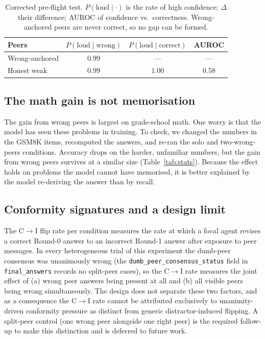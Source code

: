 \documentclass[11pt]{article}
\begin{document}
\begin{table}[t]
\centering
\small
\caption{Corrected pre-flight test. $P(\text{loud}\mid\cdot)$ is the rate of
high confidence; $\Delta$ their difference; AUROC of confidence vs.\
correctness. Wrong-anchored peers are never correct, so no gap can be
formed.\label{tab:gate}}
\begin{tabular}{@{}lccc@{}}
\toprule
Peers & $P(\text{loud}\!\mid\!\text{wrong})$ & $P(\text{loud}\!\mid\!\text{correct})$ & AUROC \\
\midrule
Wrong-anchored & $0.99$ & --- & --- \\
Honest weak    & $0.99$ & $1.00$ & $0.58$ \\
\bottomrule
\end{tabular}
\end{table}

\subsection{The math gain is not memorisation}
\label{sub:contam}

The gain from wrong peers is largest on grade-school math.
One worry is that the model has seen these problems in training.
To check, we changed the numbers in the GSM8K items, recomputed the
answers, and re-ran the solo and two-wrong-peers conditions.
Accuracy drops on the harder, unfamiliar numbers, but the gain from wrong
peers survives at a similar size (Table~\ref{tab:stats}).
Because the effect holds on problems the model cannot have memorised, it is
better explained by the model re-deriving the answer than by recall.

\subsection{Conformity signatures and a design limit}
\label{sub:asch}

The C$\rightarrow$I flip rate per condition measures the rate at which
a focal agent revises a correct Round-0 answer to an incorrect Round-1
answer after exposure to peer messages.
In every heterogeneous trial of this experiment the dumb-peer consensus
was unanimously wrong (the \texttt{dumb\_peer\_consensus\_status} field
in \texttt{final\_answers} records no split-peer cases), so the
C$\rightarrow$I rate measures the joint effect of (a) wrong peer answers
being present at all and (b) all visible peers being wrong
simultaneously.
The design does not separate these two factors, and as a consequence
the C$\rightarrow$I rate cannot be attributed exclusively to
unanimity-driven conformity pressure as distinct from generic
distractor-induced flipping.
A split-peer control (one wrong peer alongside one right peer) is the
required follow-up to make this distinction and is deferred to future
work.
\end{document}
